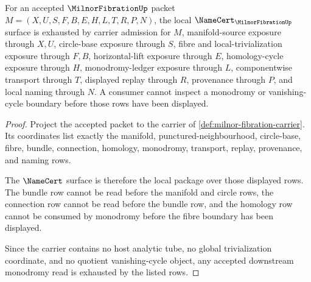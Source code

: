 \begin{theorem}
\label{thm:milnor-fibration-namecert-obligations}
For an accepted $\MilnorFibrationUp$ packet $M=(X,U,S,F,B,E,H,L,T,R,P,N)$, the local $\NameCert_{\MilnorFibrationUp}$ surface is exhausted by carrier admission for $M$, manifold-source exposure through $X,U$, circle-base exposure through $S$, fibre and local-trivialization exposure through $F,B$, horizontal-lift exposure through $E$, homology-cycle exposure through $H$, monodromy-ledger exposure through $L$, componentwise transport through $T$, displayed replay through $R$, provenance through $P$, and local naming through $N$. A consumer cannot inspect a monodromy or vanishing-cycle boundary before those rows have been displayed.
\end{theorem}
\begin{proof}
Project the accepted packet to the carrier of \autoref{def:milnor-fibration-carrier}. Its coordinates list exactly the manifold, punctured-neighbourhood, circle-base, fibre, bundle, connection, homology, monodromy, transport, replay, provenance, and naming rows.

The $\NameCert$ surface is therefore the local package over those displayed rows. The bundle row cannot be read before the manifold and circle rows, the connection row cannot be read before the bundle row, and the homology row cannot be consumed by monodromy before the fibre boundary has been displayed.

Since the carrier contains no host analytic tube, no global trivialization coordinate, and no quotient vanishing-cycle object, any accepted downstream monodromy read is exhausted by the listed rows.
\end{proof}

